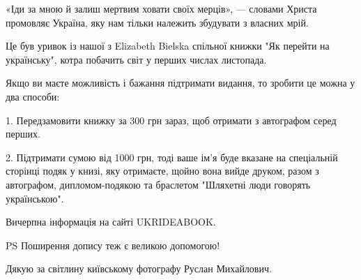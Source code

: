 «Іди за мною й залиш мертвим ховати своїх мерців», — словами Христа промовляє
Україна, яку нам тільки належить збудувати з власних мрій.

Це був уривок із нашої з Elizabeth Bielska спільної книжки "Як перейти на
українську", котра побачить світ у перших числах листопада. 

Якщо ви маєте можливість і бажання підтримати видання, то зробити це можна у
два способи:

1. Передзамовити книжку за 300 грн зараз, щоб отримати з автографом серед
перших.

2. Підтримати сумою від 1000 грн, тоді ваше ім'я буде вказане на спеціальній
сторінці подяк у книзі, яку отримаєте, щойно вона вийде друком, разом з
автографом, дипломом-подякою та браслетом "Шляхетні люди говорять українською".

Вичерпна інформація на сайті UKRIDEABOOK.

PS Поширення допису теж є великою допомогою! 🙂

Дякую за світлину київському фотографу Руслан Михайлович.

